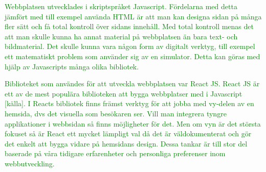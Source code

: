 \textcolor{green}{Webbplatsen utvecklades i skriptspråket Javascript. Fördelarna med detta jämfört med till exempel använda HTML är att man kan designa sidan på många fler sätt och få total kontroll över sidans innehåll. Med total kontroll menas det att man skulle kunna ha annat material på webbplatsen än bara text- och bildmaterial. Det skulle kunna vara någon form av digitalt verktyg, till exempel ett matematiskt problem som använder sig av en simulator. Detta kan göras med hjälp av Javascripts många olika bibliotek.}

\textcolor{green}{Biblioteket som användes för att utveckla webbplatsen var React JS. React JS är ett av de mest populära biblioteken att bygga webbplatser med i Javascript [källa]. I Reacts bibliotek finns främst verktyg för att jobba med vy-delen av en hemsida, dvs det visuella som besökaren ser. Vill man integrera tyngre applikationer i webbsidan så finns möjligheter för det. Men om vyn är det största fokuset så är React ett mycket lämpligt val då det är väldokumenterat och gör det enkelt att bygga vidare på hemsidans design. Dessa tankar är till stor del baserade på våra tidigare erfarenheter och personliga preferenser inom webbutveckling.}